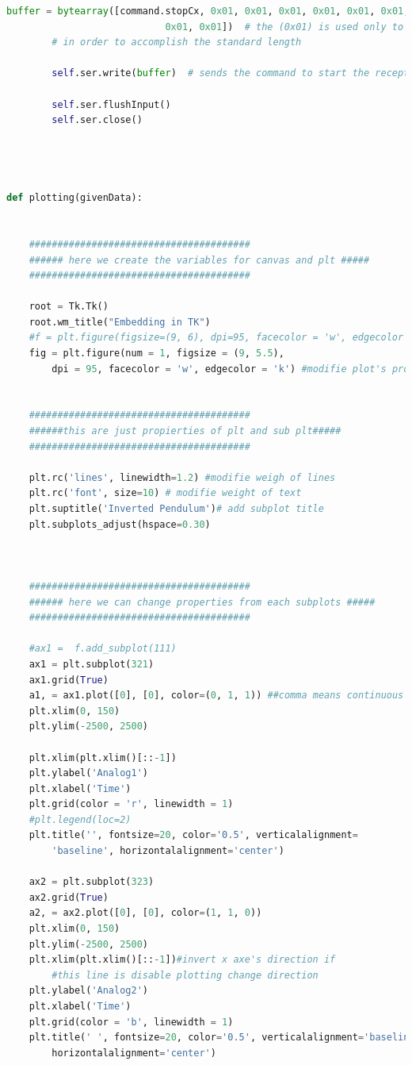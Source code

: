 {\begin{lstlisting}[language=python]
        buffer = bytearray([command.stopCx, 0x01, 0x01, 0x01, 0x01, 0x01, 0x01,
                            0x01, 0x01])  # the (0x01) is used only to fill the buffer
        # in order to accomplish the standard length

        self.ser.write(buffer)  # sends the command to start the reception

        self.ser.flushInput()
        self.ser.close()




def plotting(givenData):


    #######################################
    ###### here we create the variables for canvas and plt #####
    #######################################

    root = Tk.Tk()
    root.wm_title("Embedding in TK")
    #f = plt.figure(figsize=(9, 6), dpi=95, facecolor = 'w', edgecolor = 'k')
    fig = plt.figure(num = 1, figsize = (9, 5.5),
		dpi = 95, facecolor = 'w', edgecolor = 'k') #modifie plot's properties


    #######################################
    ######this are just propierties of plt and sub plt#####
    #######################################

    plt.rc('lines', linewidth=1.2) #modifie weigh of lines
    plt.rc('font', size=10) # modifie weight of text
    plt.suptitle('Inverted Pendulum')# add subplot title
    plt.subplots_adjust(hspace=0.30)



    #######################################
    ###### here we can change properties from each subplots #####
    #######################################

    #ax1 =  f.add_subplot(111)
    ax1 = plt.subplot(321)
    ax1.grid(True)
    a1, = ax1.plot([0], [0], color=(0, 1, 1)) ##comma means continuous plotting
    plt.xlim(0, 150)
    plt.ylim(-2500, 2500)

    plt.xlim(plt.xlim()[::-1])
    plt.ylabel('Analog1')
    plt.xlabel('Time')
    plt.grid(color = 'r', linewidth = 1)
    #plt.legend(loc=2)
    plt.title('', fontsize=20, color='0.5', verticalalignment=
		'baseline', horizontalalignment='center')

    ax2 = plt.subplot(323)
    ax2.grid(True)
    a2, = ax2.plot([0], [0], color=(1, 1, 0))
    plt.xlim(0, 150)
    plt.ylim(-2500, 2500)
    plt.xlim(plt.xlim()[::-1])#invert x axe's direction if
		#this line is disable plotting change direction
    plt.ylabel('Analog2')
    plt.xlabel('Time')
    plt.grid(color = 'b', linewidth = 1)
    plt.title(' ', fontsize=20, color='0.5', verticalalignment='baseline', 
		horizontalalignment='center')


\end{lstlisting}}
